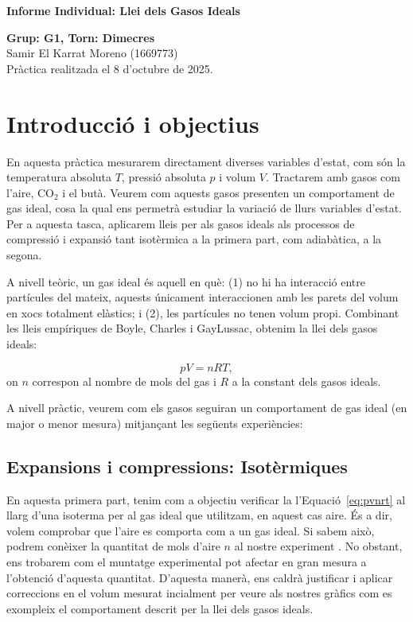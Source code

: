 \documentclass[a4paper,twoside,12pt]{article}
\theoremstyle{definition}
\begin{document}
	\begin{center}
		{\Large\bfseries Informe Individual: Llei dels Gasos Ideals}
	\end{center}
	\begin{center}
		{\bfseries Grup: G1, Torn: Dimecres}\\
				Samir El Karrat Moreno (1669773)\\
		\vspace{0.25cm}
		{Pràctica realitzada el 8 d'octubre de 2025.}
	\end{center}
	
	\tableofcontents
	
	\section{Introducció i objectius}
	
	En aquesta pràctica mesurarem directament diverses variables d'estat, com són la temperatura absoluta $T$, pressió absoluta $p$ i volum $V$. Tractarem amb gasos com l'aire, CO$_2$ i el butà. Veurem com aquests gasos presenten un comportament de gas ideal, cosa la qual ens permetrà estudiar la variació de llurs variables d'estat. Per a aquesta tasca, aplicarem lleis per als gasos ideals als processos de compressió i expansió tant isotèrmica a la primera part, com adiabàtica, a la segona.
	
	
	A nivell teòric, un gas ideal és aquell en què: (1) no hi ha interacció entre partícules del mateix, aquests únicament interaccionen amb les parets del volum en xocs totalment elàstics; i (2), les partícules no tenen volum propi. Combinant les lleis empíriques de Boyle, Charles i GayLussac, obtenim la llei dels gasos ideals:
	
	\begin{equation}
		\label{eq:pvnrt}
		p V = nRT,
	\end{equation}
	on $n$ correspon al nombre de mols del gas i $R$ a la constant dels gasos ideals.
	
	A nivell pràctic, veurem com els gasos seguiran un comportament de gas ideal (en major o menor mesura) mitjançant les següents experiències:
	
	\subsection{Expansions i compressions: Isotèrmiques}
	En aquesta primera part, tenim com a objectiu verificar la l'Equació~\ref{eq:pvnrt} al llarg d'una isoterma per al gas ideal que utilitzam, en aquest cas aire. És a dir, volem comprobar que l'aire es comporta com a un gas ideal. Si sabem això, podrem conèixer la quantitat de mols d'aire $n$ al nostre experiment . No obstant, ens trobarem com el muntatge experimental pot afectar en gran mesura a l'obtenció d'aquesta quantitat. D'aquesta manerà, ens caldrà justificar i aplicar correccions en el volum mesurat incialment per veure als nostres gràfics com es exompleix el comportament descrit per la llei dels gasos ideals.
	
\end{document}
